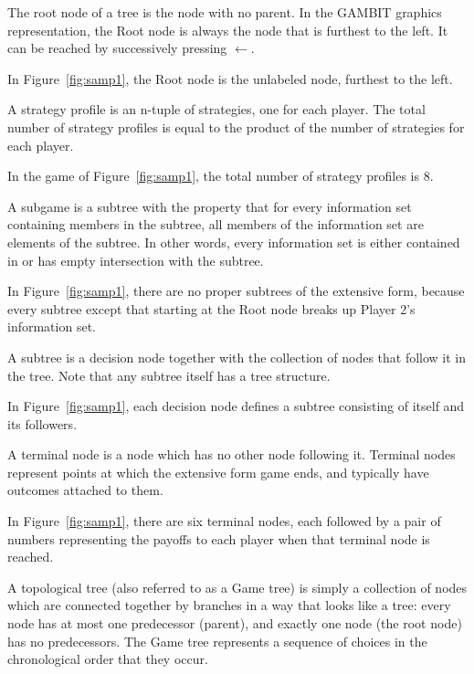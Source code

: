 \begin{helpglossary}
\label{rootnodegloss}
The root node of a tree is the node with no parent. In the GAMBIT graphics
representation, the Root node is always the node that is furthest to the
left.  It can be reached by successively pressing {\bf $\leftarrow$}. 

In Figure~\ref{fig:samp1}, the Root node is the unlabeled node, furthest to 
the left.

\label{stratprofgloss}
A strategy profile is an n-tuple of strategies, one for each player. The 
total number of strategy profiles is equal to the product of the number of 
strategies for each player. 
 
In the game of  Figure~\ref{fig:samp1}, the total number of strategy profiles
 is 8. 

\label{subgamegloss}
A subgame is a subtree with the property that for every information 
set containing members in the subtree, all members of the information 
set are elements of the subtree.  In other words, every information set 
is either contained in or has empty intersection with the subtree. 

In Figure~\ref{fig:samp1}, there are no proper subtrees of the extensive
form, because every subtree except that starting at the Root node breaks
up Player 2's information set.

\label{subtreegloss}
A subtree is a decision node together with the collection of nodes that
follow it in the tree.  Note that any subtree itself has a tree structure.

In Figure~\ref{fig:samp1}, each decision node defines a subtree consisting of itself
and its followers.   

\label{termnodegloss}
A terminal node is a node which has no other node following it.  Terminal 
nodes represent points at which the extensive form game ends, and typically 
have outcomes attached to them. 

In Figure~\ref{fig:samp1}, there are six terminal nodes, each followed by
a pair of numbers representing the payoffs to each player when that
terminal node is reached.

\label{toptreegloss}
A topological tree (also referred to as a Game tree) is simply a
collection of nodes which are connected together by branches in a way that
looks like a tree:  every node has at most one predecessor (parent), and exactly 
one node (the root node) has no predecessors.  
The Game tree represents a sequence of choices in the
chronological order that they occur.

\end{helpglossary} %



